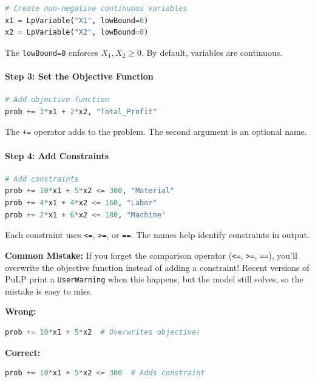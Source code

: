 \begin{lstlisting}[language=Python]
# Create non-negative continuous variables
x1 = LpVariable("X1", lowBound=0)
x2 = LpVariable("X2", lowBound=0)
\end{lstlisting}

The \texttt{lowBound=0} enforces $X_1, X_2 \geq 0$. By default, variables are continuous.

\paragraph{Step 3: Set the Objective Function}

\begin{lstlisting}[language=Python]
# Add objective function
prob += 3*x1 + 2*x2, "Total_Profit"
\end{lstlisting}

The \texttt{+=} operator adds to the problem. The second argument is an optional name.

\paragraph{Step 4: Add Constraints}

\begin{lstlisting}[language=Python]
# Add constraints
prob += 10*x1 + 5*x2 <= 300, "Material"
prob += 4*x1 + 4*x2 <= 160, "Labor"
prob += 2*x1 + 6*x2 <= 180, "Machine"
\end{lstlisting}

Each constraint uses \texttt{<=}, \texttt{>=}, or \texttt{==}. The names help identify constraints in output.

\begin{warn}
\textbf{Common Mistake:} If you forget the comparison operator (\texttt{<=}, \texttt{>=}, \texttt{==}), you'll overwrite the objective function instead of adding a constraint! Recent versions of PuLP print a \texttt{UserWarning} when this happens, but the model still solves, so the mistake is easy to miss.

\textbf{Wrong:}
\begin{lstlisting}[language=Python]
prob += 10*x1 + 5*x2  # Overwrites objective!
\end{lstlisting}

\textbf{Correct:}
\begin{lstlisting}[language=Python]
prob += 10*x1 + 5*x2 <= 300  # Adds constraint
\end{lstlisting}
\end{warn}

